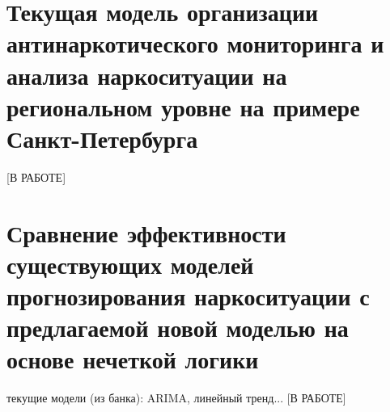 \section{Текущая модель организации антинаркотического мониторинга и анализа
наркоситуации на региональном уровне на примере Санкт-Петербурга}
[В РАБОТЕ]
\section{Сравнение эффективности существующих моделей прогнозирования
наркоситуации с предлагаемой новой моделью на основе нечеткой логики}
текущие модели (из банка): ARIMA, линейный тренд...
[В РАБОТЕ]

